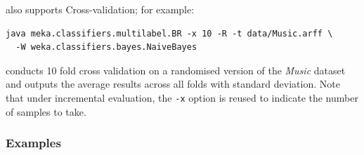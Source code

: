 \documentclass[11pt]{article}
\newcommand{\MEKA}{Meka}
\begin{document}

\framework{\MEKA} also supports \textsf{Cross-validation}; for example:
\begin{lstlisting}
java meka.classifiers.multilabel.BR -x 10 -R -t data/Music.arff \
  -W weka.classifiers.bayes.NaiveBayes
\end{lstlisting}
conducts 10 fold cross validation on a randomised version of the \textit{Music} dataset and outputs the average results across all folds with standard deviation. Note that under incremental evaluation, the \texttt{-x} option is reused to indicate the number of samples to take. %


\subsubsection{Examples} 
\label{sec:examples}
\end{document}
